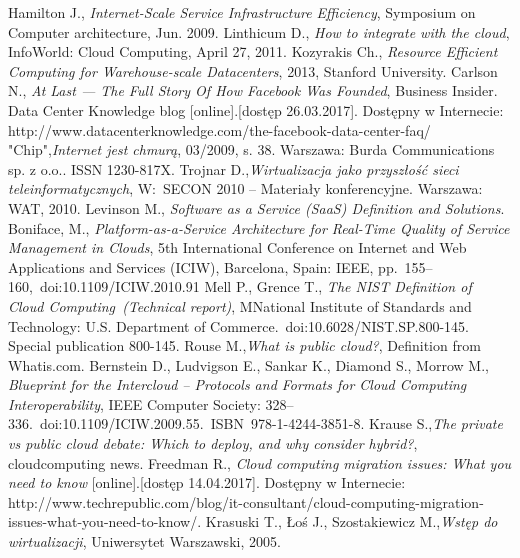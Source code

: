 \documentclass[10pt,a4paper,titlepage,twoside]{report}
\begin{document}
\begin{thebibliography}{99}
Hamilton J., \textit{Internet-Scale Service Infrastructure Efficiency}, Symposium on Computer architecture, Jun. 2009.
Linthicum D., \textit{How to integrate with the cloud}, InfoWorld: Cloud Computing, April 27, 2011.
Kozyrakis Ch., \textit{Resource Efficient Computing for Warehouse-scale Datacenters}, 2013, Stanford University.
Carlson N., \textit{At Last — The Full Story Of How Facebook Was Founded}, Business Insider.
Data Center Knowledge blog [online].[dostęp 26.03.2017]. Dostępny w Internecie: http://www.datacenterknowledge.com/the-facebook-data-center-faq/ 
"Chip",\textit{Internet jest chmurą}, 03/2009, s. 38. Warszawa: Burda Communications sp. z o.o.. ISSN 1230-817X.
Trojnar D.,\textit{Wirtualizacja jako przyszłość sieci teleinformatycznych}, W: SECON 2010 – Materiały konferencyjne. Warszawa: WAT, 2010.
Levinson M., \textit{Software as a Service (SaaS) Definition and Solutions}.
Boniface, M., \textit{Platform-as-a-Service Architecture for Real-Time Quality of Service Management in Clouds}, 5th International Conference on Internet and Web Applications and Services (ICIW), Barcelona, Spain: IEEE, pp. 155–160, doi:10.1109/ICIW.2010.91
Mell P., Grence T., \textit{The NIST Definition of Cloud Computing (Technical report)}, MNational Institute of Standards and Technology: U.S. Department of Commerce. doi:10.6028/NIST.SP.800-145. Special publication 800-145.
Rouse M.,\textit{What is public cloud?}, Definition from Whatis.com.
Bernstein D., Ludvigson E., Sankar K., Diamond S., Morrow M., \textit{Blueprint for the Intercloud – Protocols and Formats for Cloud Computing Interoperability}, IEEE Computer Society: 328–336. doi:10.1109/ICIW.2009.55. ISBN 978-1-4244-3851-8. 
Krause S.,\textit{The private vs public cloud debate: Which to deploy, and why consider hybrid?}, cloudcomputing news.
Freedman R., \textit{Cloud computing migration issues: What you need to know} [online].[dostęp 14.04.2017]. Dostępny w Internecie: http://www.techrepublic.com/blog/it-consultant/cloud-computing-migration-issues-what-you-need-to-know/.
Krasuski T., Łoś J., Szostakiewicz M.,\textit{Wstęp do wirtualizacji}, Uniwersytet Warszawski, 2005.


\end{thebibliography}

\end{document}
